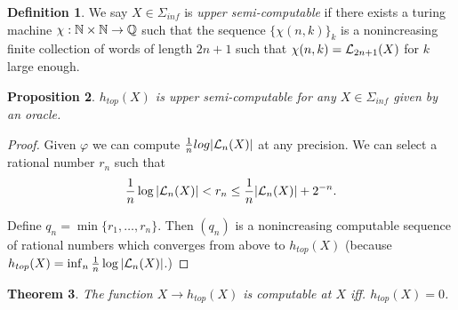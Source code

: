 \documentclass[11pt, reqno]{amsart}
\theoremstyle{plain}
\newtheorem{thm}{Theorem}[section]
\numberwithin{thm}{subsection}
\newtheorem{prop}[thm]{Proposition}
\theoremstyle{definition}
\newtheorem{defn}[thm]{Definition}
\begin{document}
\begin{defn}
  We say $X \in \Sigma_{inf}$ is \textit{upper semi-computable} if there exists a turing machine $\chi: \mathbb{N} \times \mathbb{N} \rightarrow \mathbb{Q}$ such that the sequence $\{\chi(n,k)\}_k$ is a nonincreasing finite collection of words of length $2n+1$ such that $\chi(n,k) = \mathcal{L}_{2n+1}(X)$ for $k$ large enough.
\end{defn}



\begin{prop}
  $h_{top}(X)$ is upper semi-computable for any $X \in \Sigma_{inf}$ given by an oracle.
\end{prop}

\begin{proof}
  Given $\varphi$ we can compute $\frac{1}{n}log|\mathcal{L}_n(X)|$ at any precision. We can select a rational number $r_n$ such that 
  $$\frac{1}{n}\log|\mathcal{L}_n(X)| < r_n \leq \frac{1}{n}|\mathcal{L}_n(X)|+2^{-n}.$$

  Define $q_n = \min\{r_1, \dots, r_n\}$. Then $(q_n)$ is a nonincreasing computable sequence of rational numbers which converges from above to $h_{top}(X)$ (because $h_{top}(X) = \inf_{n}\frac{1}{n}\log|\mathcal{L}_n(X)|$.)
\end{proof}

\begin{thm}
  The function $X \rightarrow h_{top}(X)$ is computable at $X$ iff. $h_{top}(X) = 0$.
\end{thm}
\end{document}
